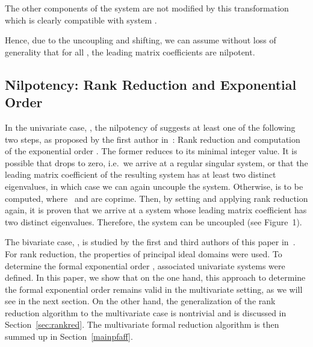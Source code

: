 \documentclass[final,1p,times,number,amsthm]{elsart}
\begin{document}
The other components of the system are not modified by this transformation which
is clearly compatible with system .

Hence, due to the uncoupling and shifting, we can assume without
loss of generality that for all , the leading matrix
coefficients  are nilpotent.
\subsection{Nilpotency: Rank Reduction and Exponential Order}
\label{rampfaff}
In the univariate case, , the nilpotency of  suggests at least one
of the following two steps, as proposed by the first author in~\cite{key24}:
Rank reduction and computation of the exponential order . The
former reduces  to its minimal integer value. It is possible that 
drops to zero, i.e.\ we arrive at a regular singular system, or that the leading matrix
coefficient of the resulting system has at least two distinct eigenvalues, in
which case we can again uncouple the system. Otherwise,
 is to be computed, where~ and  are
coprime. Then, by setting  and applying rank reduction again, it
is proven that we arrive at a system whose leading matrix coefficient has two
distinct eigenvalues. Therefore, the system can be uncoupled (see
Figure~1).


The bivariate case, , is studied by the first and third authors of this
paper in~\cite{key101}. For rank reduction, the properties of principal ideal
domains were used. To determine the formal exponential order ,
associated univariate systems were defined. In this paper, we show that on the
one hand, this approach to determine the formal exponential order remains valid
in the multivariate setting, as we will see in the next section. On the other
hand, the generalization of the rank reduction algorithm to the multivariate
case is nontrivial and is discussed in Section~\ref{sec:rankred}. The
multivariate formal reduction algorithm is then summed up in
Section~\ref{mainpfaff}.
\end{document}
